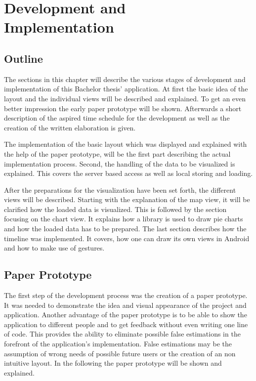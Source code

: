 \chapter{Development and\\Implementation}
\label{cha:implementation}

\section{Outline}
The sections in this chapter will describe the various stages of development and implementation of this Bachelor thesis' application. At first the basic idea of the layout and the individual views will be described and explained. To get an even better impression the early paper prototype will be shown. Afterwards a short description of the aspired time schedule for the development as well as the creation of the written elaboration is given.

The implementation of the basic layout which was displayed and explained with the help of the paper prototype, will be the first part describing the actual implementation process.
Second, the handling of the data to be visualized is explained. This covers the server based access as well as local storing and loading. 

After the preparations for the visualization have been set forth, the different views will be described. Starting with the explanation of the map view, it will be clarified how the loaded data is visualized. This is followed by the section focusing on the chart view. It explains how a library is used to draw pie charts and how the loaded data has to be prepared. The last section describes how the timeline was implemented. It covers, how one can draw its own views in Android and how to make use of gestures.
\newpage
\section{Paper Prototype}
\label{sec:paper_prototype}
The first step of the development process was the creation of a paper prototype. It was needed to demonstrate the idea and visual appearance of the project and application. Another advantage of the paper prototype is to be able to show the application to  different people and to get feedback without even writing one line of code. This provides the ability to eliminate possible false estimations  in the forefront of the application's implementation. False estimations may be the assumption of wrong needs of possible future users or the creation of an non intuitive layout. In the following the paper prototype will be shown and explained.

